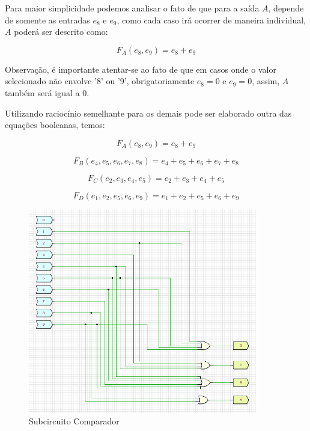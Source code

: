 \documentclass[12pt]{article}
\begin{document}
Para maior simplicidade podemos analisar o fato de que para a saída
\textbf{$A$}, depende de somente as entradas $e_{8}$ e $e_{9}$, como cada caso
irá ocorrer de maneira individual, \textbf{$A$} poderá ser descrito como:

\begin{equation}
F_{A}(e_{8}, e_{9}) = e_{8} + e_{9}
\end{equation}

Observação, é importante atentar-se ao fato de que em casos onde o valor
selecionado não envolve '8' ou '9', obrigatoriamente $e_{8}=0$ e $e_{9}=0$,
assim, \textbf{$A$} também será igual a 0.

Utilizando raciocínio semelhante para os demais pode ser elaborado outra das
equações booleanas, temos:

\begin{equation}
F_{A}(e_{8}, e_{9}) = e_{8} + e_{9}
\end{equation}

\begin{equation}
F_{B}(e_{4},e_{5},e_{6},e_{7},e_{8}) = e_{4}+e_{5}+e_{6}+e_{7}+e_{8}
\end{equation}

\begin{equation}
F_{C}(e_{2},e_{3},e_{4},e_{5}) = e_{2}+e_{3}+e_{4}+e_{5}
\end{equation}

\begin{equation}
F_{D}(e_{1},e_{2},e_{5},e_{6},e_{9}) = e_{1}+e_{2}+e_{5}+e_{6}+e_{9}
\end{equation}

\begin{figure}[H]
    \centering
    \includegraphics[width=10cm]{Exp05/2.1.png}
    \caption{Subcircuito Comparador}
    \label{fig:subComparador2.1}
\end{figure}
\end{document}
